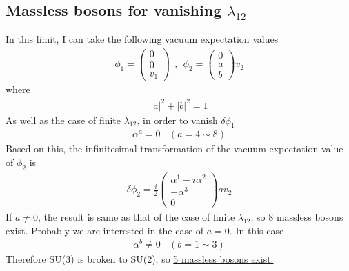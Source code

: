 \subsection{Massless bosons for vanishing $\lambda_{12}$}
In this limit, I can take the following vacuum expectation values
\begin{align*}
    \phi_1=\begin{pmatrix}
        0\\0\\v_1
    \end{pmatrix}\ \ ,\ \ \phi_2=\begin{pmatrix}
        0\\a\\b
    \end{pmatrix}v_2
\end{align*}
where
\begin{align*}
    |a|^2+|b|^2=1
\end{align*}
As well as the case of finite $\lambda_{12}$, in order to vanish $\delta\phi_1$
\begin{align*}
    \alpha^a=0\ \ \ \ (a=4\sim8)
\end{align*}
Based on this, the infinitesimal transformation of the vacuum expectation value of $\phi_2$ is
\begin{align*}
    \delta\phi_2=\frac{i}{2}\begin{pmatrix}
        \alpha^1-i\alpha^2\\
        -\alpha^3\\
        0
    \end{pmatrix}av_2
\end{align*}
If $a\neq0$, the result is same as that of the case of finite $\lambda_{12}$, so 8 massless bosons exist. Probably we are interested in the case of $a=0$. In this case
\begin{align*}
    \alpha^b\neq0\ \ \ \ (b=1\sim3)
\end{align*}
Therefore SU(3) is broken to SU(2), so \underline{5 massless bosons exist.}


